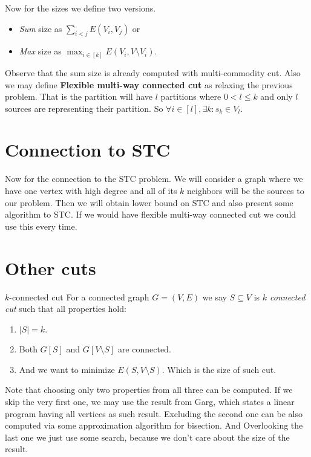 \documentclass{article}
\begin{document}
	Now for the sizes we define two versions.
	
	\begin{itemize}
		\item \textit{Sum} size as $\sum_{i < j} E(V_i, V_j)$ or
		\item \textit{Max} size as $\max_{i \in[k]} E(V_i, V \setminus V_i)$.
	\end{itemize}
	
	Observe that the sum size is already computed with multi-commodity cut. Also we may define \textbf{Flexible multi-way connected cut} as relaxing the previous problem. That is the partition will have $l$ partitions where $0 < l \leq k$ and only $l$ sources are representing their partition. So $\forall i \in [l] , \exists k : s_k \in V_l$.
	
	\section{Connection to STC}
	
	Now for the connection to the STC problem. We will consider a graph where we have one vertex with high degree and all of its $k$ neighbors will be the sources to our problem. Then we will obtain lower bound on STC and also present some algorithm to STC. If we would have flexible multi-way connected cut we could use this every time.
	
	\section{Other cuts}
	
	\begin{problem}{$k$-connected cut}
		For a connected graph $G = (V,E)$ we say $S \subseteq V$ is \textit{$k$ connected cut} such that all properties hold:
		
		\begin{enumerate}
			\item $|S| = k$.
			\item Both $G[S]$ and $G[V \setminus S]$ are connected.
			\item And we want to minimize $E(S, V \setminus S)$. Which is the size of such cut.
		\end{enumerate}
	\end{problem}
	
	
	Note that choosing only two properties from all three can be computed. If we skip the very first one, we may use the result from Garg, which states a linear program having all vertices as such result. Excluding the second one can be also computed via some approximation algorithm for bisection. And Overlooking the last one we just use some search, because we don't care about the size of the result.
	
\end{document}

